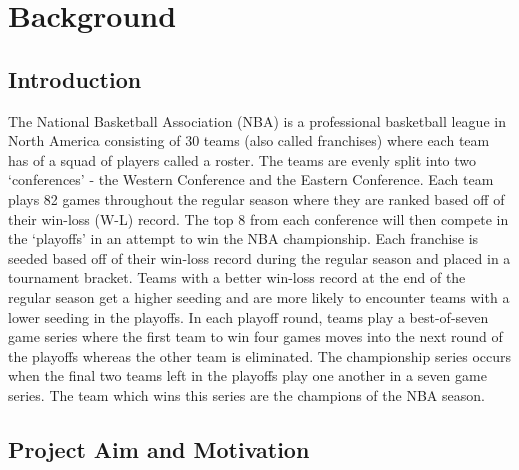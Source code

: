 \documentclass[a4paper,11pt,twoside]{article}
\begin{document}
\tableofcontents
\newpage

\section{Background}
\vspace{6mm}

\subsection{Introduction}

The National Basketball Association (NBA) is a professional basketball league in North America consisting of 30 teams (also called franchises) where each team has of a squad of players called a roster. The teams are evenly split into two `conferences' - the Western Conference and the Eastern Conference. Each team plays 82 games throughout the regular season where they are ranked based off of their win-loss (W-L) record. The top 8 from each conference will then compete in the `playoffs' in an attempt to win the NBA championship. Each franchise is seeded based off of their win-loss record during the regular season and placed in a tournament bracket. Teams with a better win-loss record at the end of the regular season get a higher seeding and are more likely to encounter teams with a lower seeding in the playoffs. In each playoff  round, teams play a best-of-seven game series where the first team to win four games moves into the next round of the playoffs whereas the other team is eliminated. The championship series occurs when the final two teams left in the playoffs play one another in a seven game series. The team which wins this series are the champions of the NBA season.


\subsection{Project Aim and Motivation}
\end{document}
